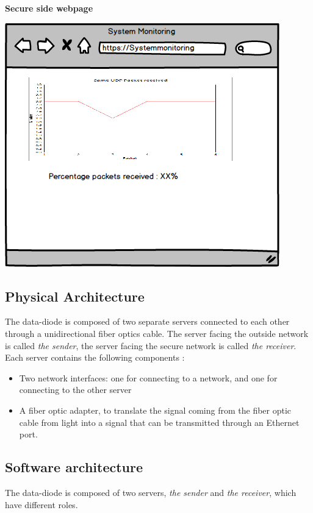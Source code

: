 \documentclass[a4paper,11pt]{article}
\begin{document}
\textbf{Secure side webpage}
\begin{center}
\includegraphics[scale=0.5]{img/linkudp.png}
\end{center}



\subsection{Physical Architecture}
The data-diode is composed of two separate servers connected to each other through a unidirectional fiber optics cable. The server facing the outside network is called \textit{the sender}, the server facing the secure network is called \textit{the receiver}.\\

Each server contains the following components :
\begin{itemize}
\item{Two network interfaces: one for connecting to a network, and one for connecting to the other server}
\item{A fiber optic adapter, to translate the signal coming from the fiber optic cable from light into a signal that can be transmitted through an Ethernet port.}
\end{itemize}

\subsection{Software architecture}
The data-diode is composed of two servers, \textit{the sender} and \textit{the receiver}, which have different roles. 
\end{document}
